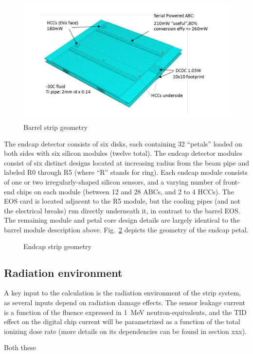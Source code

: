 \begin{figure}[ht]
\centering
\includegraphics[width=0.4\linewidth]{figures/barrelmodule.pdf}
\caption{Barrel strip geometry}
\label{fig:barrelgeometry}
\end{figure}

The endcap detector consists of six disks, each containing 32 ``petals'' loaded on
both sides with six silicon modules (twelve total).
The endcap detector modules consist of six distinct designs located at increasing radius from the
beam pipe and labeled R0 through R5 (where ``R'' stands for ring). Each endcap module consists of one
or two irregularly-shaped silicon sensors, and a varying number of front-end chips on each module
(between 12 and 28 ABCs, and 2 to 4 HCCs). The EOS card is located adjacent to the R5 module, but the
cooling pipes (and not the electrical breaks) run directly underneath it, in contrast to the barrel EOS.
The remaining module and petal core design details are largely identical to the barrel module description above.
Fig.~\ref{fig:endcapgeometry} depicts the geometry of the endcap petal.

\begin{figure}[ht]
\centering
\caption{Endcap strip geometry}
\label{fig:endcapgeometry}
\end{figure}

\subsection{Radiation environment}
A key input to the calculation is the radiation environment of the strip system, as several inputs depend on radiation damage effects. The sensor leakage current is a function of the fluence expressed in 1~MeV neutron-equivalents, and the TID effect on the digital chip current will be parametrized as a function of the total ionizing dose rate (more details on its dependencies can be found in section xxx). 

Both these 


